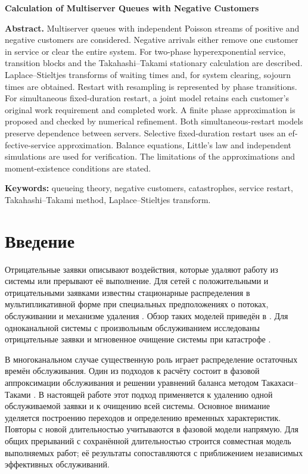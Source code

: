 \documentclass[a4paper,12pt]{article}
\begin{document}
\begin{otherlanguage}{english}
\bigskip
\begin{center}\textbf{Calculation of Multiserver Queues with Negative Customers}\end{center}
\textbf{Abstract.} Multiserver queues with independent Poisson streams of positive and negative customers are considered. Negative arrivals either remove one customer in service or clear the entire system. For two-phase hyperexponential service, transition blocks and the Takahashi--Takami stationary calculation are described. Laplace--Stieltjes transforms of waiting times and, for system clearing, sojourn times are obtained. Restart with resampling is represented by phase transitions. For simultaneous fixed-duration restart, a joint model retains each customer's original work requirement and completed work. A finite phase approximation is proposed and checked by numerical refinement. Both simultaneous-restart models preserve dependence between servers. Selective fixed-duration restart uses an effective-service approximation. Balance equations, Little's law and independent simulations are used for verification. The limitations of the approximations and moment-existence conditions are stated.

\textbf{Keywords:} queueing theory, negative customers, catastrophes, service restart, Takahashi--Takami method, Laplace--Stieltjes transform.
\end{otherlanguage}


\section{Введение}
Отрицательные заявки описывают воздействия, которые удаляют работу из системы или прерывают её выполнение. Для сетей с положительными и отрицательными заявками известны стационарные распределения в мультипликативной форме при специальных предположениях о потоках, обслуживании и механизме удаления \cite{gelenbe1991,gelenbe1992}. Обзор таких моделей приведён в \cite{artalejo2000}. Для одноканальной системы с произвольным обслуживанием исследованы отрицательные заявки \cite{harrison1996} и мгновенное очищение системы при катастрофе \cite{jain1996}.

В многоканальном случае существенную роль играет распределение остаточных времён обслуживания. Один из подходов к расчёту состоит в фазовой аппроксимации обслуживания и решении уравнений баланса методом Такахаси--Таками \cite{takahashi1976,ryzhikov2018ru}. В настоящей работе этот подход применяется к удалению одной обслуживаемой заявки и к очищению всей системы. Основное внимание уделяется построению переходов и определению временных характеристик. Повторы с новой длительностью учитываются в фазовой модели напрямую. Для общих прерываний с сохранённой длительностью строится совместная модель выполняемых работ; её результаты сопоставляются с приближением независимых эффективных обслуживаний.
\end{document}
